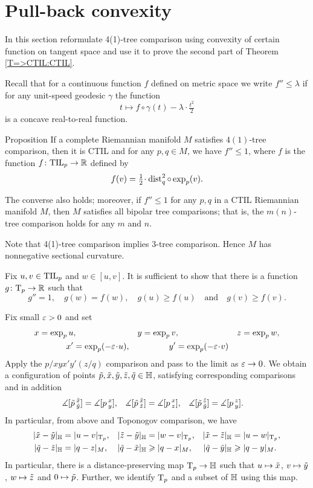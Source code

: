 \section{Pull-back convexity}\label{convexity}

In this section reformulate 4(1)-tree comparison using convexity of certain function on tangent space and use it to prove the second part of Theorem \ref{T=>CTIL:CTIL}.

Recall that for a continuous function $f$ defined on metric space we write 
$f''\le \lambda$ if for any unit-speed geodesic $\gamma$ the function
\[t\mapsto f\circ\gamma(t)-\lambda\cdot \tfrac{t^2}{2}\]
is a concave real-to-real function.

\begin{thm}{Proposition}\label{prop:convexity}
If a complete Riemannian manifold $M$ satisfies $4(1)$-tree comparison, then it is CTIL and for any $p,q\in M$, we have $f''\le 1$, where $f$ is the function $f\: \TIL_p\to \RR$ defined by
\[f(v)=\tfrac12\cdot\dist_q^2\circ\exp_p(v).\] 

The converse also holds; moreover, if $f''\le 1$ for any $p,q$ in a CTIL Riemannian manifold $M$, then $M$ satisfies all bipolar tree comparisons; that is, the $m(n)$-tree comparison holds for any $m$ and $n$.
\end{thm}

Note that 4(1)-tree comparison implies 3-tree comparison.
Hence $M$ has nonnegative sectional curvature.

Fix $u,v\in \TIL_p$ and $w\in [u,v]$.
It is sufficient to show that there is a function $g\:\T_p\to \RR$ such that
\[g''=1,\quad
g(w)=f(w),\quad
g(u)\ge f(u)\quad
\text{and}\quad
g(v)\ge f(v).\]

Fix small $\eps>0$ and set
\begin{align*}
x=\exp_p u&,
&y=\exp_p v&, 
&z=\exp_pw&,
\\
x'&=\exp_p(-\eps\cdot  u),
&y'&=\exp_p(-\eps\cdot  v)
\end{align*}
Apply the $p/xyx'y'(z/q)$ comparison and pass to the limit as $\eps\to 0$.
We obtain a configuration of points $\~p, \~x, \~y, \~z, \~q\in\HH$, satisfying corresponding comparisons and
in addition
\begin{align*}
\measuredangle[\~p\,^{\~x}_{\~y}]&= \measuredangle[p\,^{x}_{y}],
&\measuredangle[\~p\,^{\~x}_{\~z}]&= \measuredangle[p\,^{x}_{z}],
&\measuredangle[\~p\,^{\~z}_{\~y}]&= \measuredangle[p\,^{z}_{y}].
\end{align*}
In particular,
from above and Toponogov comparison, we have
\begin{align*}
|\~x-\~y|_\HH&=|u-v|_{\T_p},
&|\~z-\~y|_\HH&=|w-v|_{\T_p},
&|\~x-\~z|_\HH&=|u-w|_{\T_p},
\\
|\~q-\~z|_\HH&=|q-z|_M,
&|\~q-\~x|_\HH&\ge|q-x|_M,
&|\~q-\~y|_\HH&\ge|q-y|_M.
\end{align*}
In particular, there is a distance-preserving map $\T_p\to \HH$ 
such that $u\mapsto \~x$, $v\mapsto \~y$, $w\mapsto \~z$ and $0\mapsto \~p$.
Further, we identify $\T_p$ and a subset of $\HH$ using this map.

